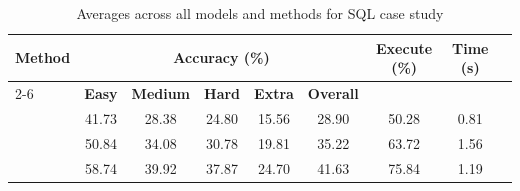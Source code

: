 \begin{table}[ht]
    \centering
    \scriptsize
    \caption{Averages across all models and methods for SQL case study}
    \label{tab:avg_stats}
    \begin{tabular}{lcccccccc}
        \toprule
        \multirow{2}{*}{\textbf{Method}} & \multicolumn{5}{c}{\textbf{Accuracy (\%)}} & \multirow{2}{*}{\textbf{Execute (\%)}} & \multirow{2}{*}{\textbf{Time (s)}} \\
        \cmidrule(lr){2-6}
        & \textbf{Easy} & \textbf{Medium} & \textbf{Hard} & \textbf{Extra} & \textbf{Overall} & & \\
        \midrule
        \standard{} & 41.73 & 28.38 & 24.80 & 15.56 & 28.90 & 50.28 & 0.81 \\
        \syncode{}  & 50.84 & 34.08 & 30.78 & 19.81 & 35.22 & 63.72 & 1.56 \\
        \Tool{}     & 58.74 & 39.92 & 37.87 & 24.70 & 41.63 & 75.84 & 1.19 \\
        \bottomrule
    \end{tabular}
\end{table}